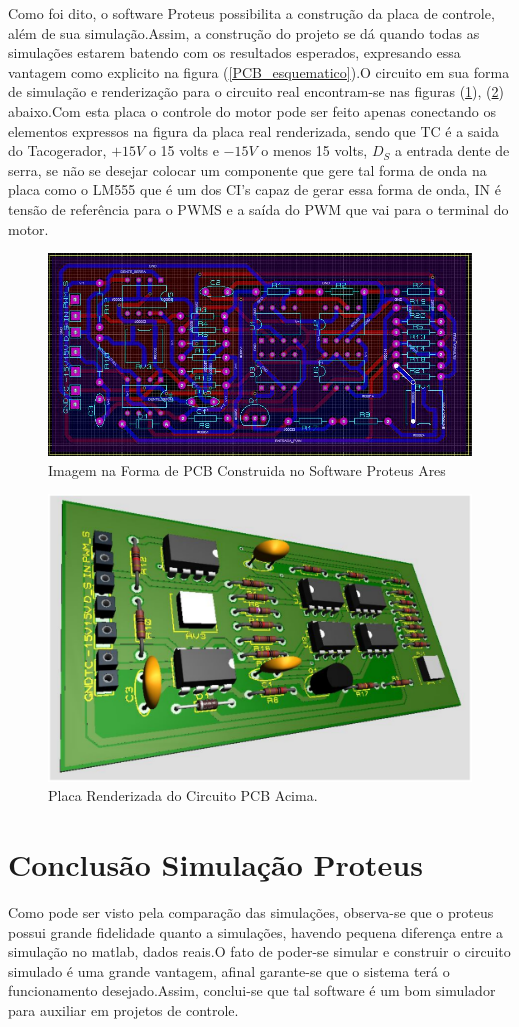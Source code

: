 \documentclass[11pt, a4paper, oneside]{article}
\begin{document}
Como foi dito, o software Proteus possibilita a construção da placa de controle, além de sua simulação.Assim, a construção do projeto se dá quando todas as simulações estarem batendo com os resultados esperados, expresando essa vantagem como explicito na figura (\ref{PCB_esquematico}).O circuito em sua forma de simulação e renderização para o circuito real encontram-se nas figuras (\ref{PCB}), (\ref{Real}) abaixo.Com esta placa o controle do motor pode ser feito apenas conectando os elementos expressos na figura da placa real renderizada, sendo que  TC é a saida do Tacogerador, $+15V$ o 15 volts e $-15V$ o  menos 15 volts, $D_S$ a entrada dente de serra, se não se desejar colocar um componente que gere tal forma de onda na placa como o LM555 que é um dos CI's capaz de gerar essa forma  de onda, IN é tensão de referência para o PWMS e a saída do PWM que vai para o terminal do motor.

\begin{figure}[h!]
\centering
\includegraphics[width=.5\textwidth]{Proteus_PCB.jpg}
\caption{Imagem na Forma de PCB Construida no Software Proteus Ares}
\label{PCB}
\end{figure}

\begin{figure}[h!]
\centering
\includegraphics[width=.5\textwidth]{Proteus_Real.pdf}
\caption{Placa Renderizada do Circuito PCB Acima.}
\label{Real}
\end{figure}

\newpage

\section{Conclusão Simulação Proteus}
Como pode ser visto pela comparação das simulações, observa-se que o proteus possui grande fidelidade quanto a simulações, havendo pequena diferença entre a simulação no matlab, dados reais.O fato de poder-se simular e construir o circuito simulado é uma grande vantagem, afinal garante-se que o sistema terá o funcionamento desejado.Assim, conclui-se que tal software é um bom simulador para auxiliar em projetos de controle.

\newpage

 

\end{document}

